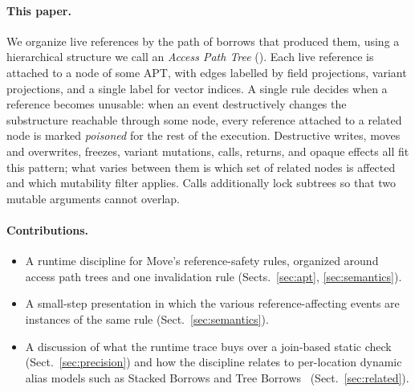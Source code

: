 \paragraph{This paper.}
We organize live references by the path of borrows that produced
them, using a hierarchical structure we call an \emph{Access Path
Tree} (\apt). Each live reference is attached to a node of some APT,
with edges labelled by field projections, variant projections, and
a single label for vector indices. A single rule decides when a
reference becomes unusable: when an event destructively changes the
substructure reachable through some node, every reference attached
to a related node is marked \emph{poisoned} for the rest of the
execution. Destructive writes, moves and overwrites, freezes,
variant mutations, calls, returns, and opaque effects all fit this
pattern; what varies between them is which set of related nodes is
affected and which mutability filter applies. Calls additionally
lock subtrees so that two mutable arguments cannot overlap.

\paragraph{Contributions.}
\begin{itemize}
\item A runtime discipline for Move's reference-safety rules,
  organized around access path trees and one invalidation rule
  (Sects.~\ref{sec:apt}, \ref{sec:semantics}).
\item A small-step presentation in which the various
  reference-affecting events are instances of the same rule
  (Sect.~\ref{sec:semantics}).
\item A discussion of what the runtime trace buys over a join-based
  static check (Sect.~\ref{sec:precision}) and how the discipline
  relates to per-location dynamic alias models such as Stacked
  Borrows and Tree Borrows~\cite{stackedborrows,treeborrows}
  (Sect.~\ref{sec:related}).
\end{itemize}
